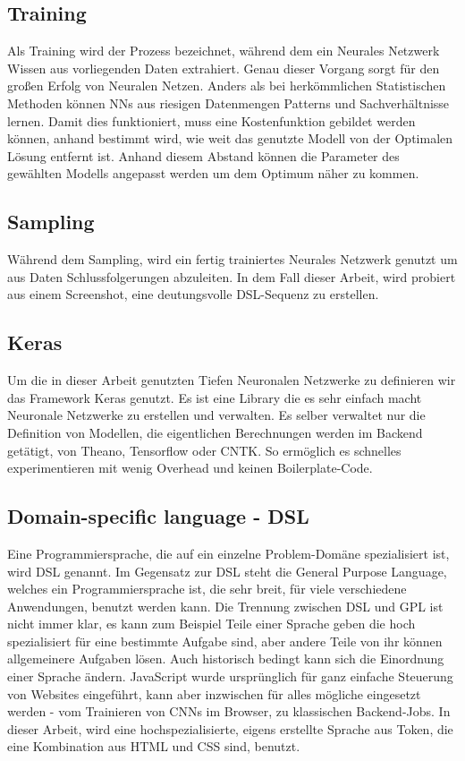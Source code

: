 \documentclass[pdftex,a4paper,halfparskip]{scrartcl}
\begin{document}
\subsection{Training}

Als Training wird der Prozess bezeichnet, während dem ein Neurales Netzwerk Wissen aus vorliegenden Daten extrahiert. Genau dieser Vorgang sorgt für den großen Erfolg von Neuralen Netzen. Anders als bei herkömmlichen Statistischen Methoden können NNs aus riesigen Datenmengen Patterns und Sachverhältnisse lernen. Damit dies funktioniert, muss eine Kostenfunktion gebildet werden können, anhand bestimmt wird, wie weit das genutzte Modell von der Optimalen Lösung entfernt ist. Anhand diesem Abstand können die Parameter des gewählten Modells angepasst werden um dem Optimum näher zu kommen.

\subsection{Sampling}
Während dem Sampling, wird ein fertig trainiertes Neurales Netzwerk genutzt um aus Daten Schlussfolgerungen abzuleiten. In dem Fall dieser Arbeit, wird probiert aus einem Screenshot, eine deutungsvolle DSL-Sequenz zu erstellen.

\subsection{Keras}
Um die in dieser Arbeit genutzten Tiefen Neuronalen Netzwerke zu definieren wir das Framework Keras genutzt. Es ist eine Library die es sehr einfach macht Neuronale Netzwerke zu erstellen und verwalten. Es selber verwaltet nur die Definition von Modellen, die eigentlichen Berechnungen werden im Backend getätigt, von Theano, Tensorflow oder CNTK. So ermöglich es schnelles experimentieren mit wenig Overhead und keinen Boilerplate-Code. 

\subsection{Domain-specific language - DSL}

Eine Programmiersprache, die auf ein einzelne Problem-Domäne spezialisiert ist, wird DSL genannt. Im Gegensatz zur DSL steht die General Purpose Language, welches ein Programmiersprache ist, die sehr breit, für viele verschiedene Anwendungen, benutzt werden kann. Die Trennung zwischen DSL und GPL ist nicht immer klar, es kann zum Beispiel Teile einer Sprache geben die hoch spezialisiert für eine bestimmte Aufgabe sind, aber andere Teile von ihr können allgemeinere Aufgaben lösen. Auch historisch bedingt kann sich die Einordnung einer Sprache ändern. JavaScript wurde ursprünglich für ganz einfache Steuerung von Websites eingeführt, kann aber inzwischen für alles mögliche eingesetzt werden - vom Trainieren von CNNs im Browser, zu klassischen Backend-Jobs. 
In dieser Arbeit, wird eine hochspezialisierte, eigens erstellte Sprache aus Token, die eine Kombination aus HTML und CSS sind, benutzt.
\end{document}
